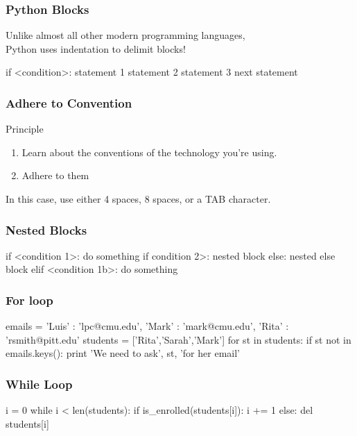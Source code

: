 \begin{frame}[fragile]
\frametitle{Python Blocks}

Unlike almost all other modern programming languages,\\
Python uses \alert{indentation} to delimit blocks!

\begin{python}
if <condition>:
    statement 1
    statement 2
    statement 3
next statement
\end{python}

\end{frame}

\begin{frame}[fragile]
\frametitle{Adhere to Convention}
\begin{block}{Principle}
\begin{enumerate}
\item Learn about the conventions of the technology you're using.
\item Adhere to them
\end{enumerate}
\end{block}

In this case, use either 4 spaces, 8 spaces, or a TAB character.
\end{frame}

\begin{frame}[fragile]
\frametitle{Nested Blocks}

\begin{python}
if <condition 1>:
    do something
    if condition 2>:
        nested block
    else:
        nested else block
elif <condition 1b>:
    do something
\end{python}
\end{frame}

\begin{frame}[fragile]
\frametitle{For loop}

\begin{python}
emails = { 'Luis' : 'lpc@cmu.edu',
           'Mark' : 'mark@cmu.edu',
           'Rita' : 'rsmith@pitt.edu' }
students = ['Rita','Sarah','Mark']
for st in students:
    if st not in emails.keys():
        print 'We need to ask', st, 'for her email'
\end{python}
\end{frame}

\begin{frame}[fragile]
\frametitle{While Loop}

\begin{python}
i = 0
while i < len(students):
    if is_enrolled(students[i]):
        i += 1
    else:
        del students[i]
\end{python}
\end{frame}

